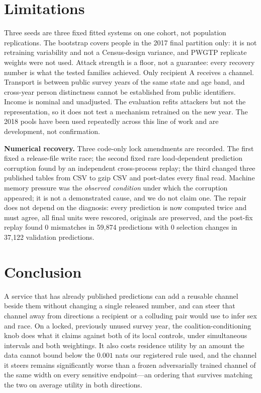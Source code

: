 \documentclass[10pt]{article}
\begin{document}
\section{Limitations}
\label{sec:limitations}

Three seeds are three fixed fitted systems on one cohort, not population replications. The bootstrap
covers people in the 2017 final partition only: it is not retraining variability and not a
Census-design variance, and PWGTP replicate weights were not used. Attack strength is a floor, not a
guarantee: every recovery number is what the tested families achieved. Only recipient A receives a
channel. Transport is between public survey years of the same state and age band, and cross-year
person distinctness cannot be established from public identifiers. Income is nominal and unadjusted.
The evaluation refits attackers but not the representation, so it does not test a mechanism retrained
on the new year. The 2018 pools have been used repeatedly across this line of work and are
development, not confirmation.

\textbf{Numerical recovery.} Three code-only lock amendments are recorded. The first fixed a
release-file write race; the second fixed rare load-dependent prediction corruption found by an
independent cross-process replay; the third changed three published tables from CSV to gzip CSV and
post-dates every final read. Machine memory pressure was the \emph{observed condition} under which
the corruption appeared; it is not a demonstrated cause, and we do not claim one. The repair does not
depend on the diagnosis: every prediction is now computed twice and must agree, all final units were
rescored, originals are preserved, and the post-fix replay found 0 mismatches in 59{,}874 predictions
with 0 selection changes in 37{,}122 validation predictions.

\section{Conclusion}
\label{sec:conclusion}

A service that has already published predictions can add a reusable channel beside them without
changing a single released number, and can steer that channel away from directions a recipient or a
colluding pair would use to infer sex and race. On a locked, previously unused survey year, the
coalition-conditioning knob does what it claims against both of its local controls, under
simultaneous intervals and both weightings. It also costs residence utility by an amount the data
cannot bound below the $0.001$ nats our registered rule used, and the channel it steers remains
significantly worse than a frozen adversarially trained channel of the same width on every sensitive
endpoint---an ordering that survives matching the two on average utility in both directions.
\end{document}
